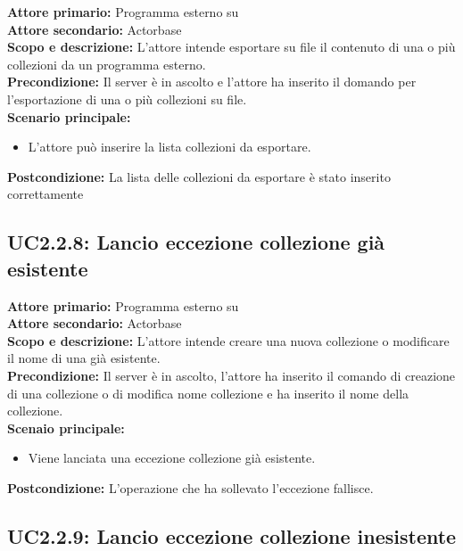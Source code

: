 \documentclass{scalatekids-article}
\begin{document}
\textbf{Attore primario:} Programma esterno su \\
\textbf{Attore secondario:} Actorbase\\
\textbf{Scopo e descrizione:} L'attore intende esportare su file il contenuto di una o più collezioni da un programma  esterno.\\
\textbf{Precondizione:} Il server è in ascolto e l'attore ha inserito il domando per l'esportazione di una o più collezioni su file.\\
\textbf{Scenario principale:}
\begin{itemize}
\item L'attore può inserire la lista collezioni da esportare.
\end{itemize}
\textbf{Postcondizione:} La lista delle collezioni da esportare è stato inserito correttamente

\subsection{UC2.2.8: Lancio eccezione collezione già esistente}

\textbf{Attore primario:} Programma esterno su \\
\textbf{Attore secondario:} Actorbase\\
\textbf{Scopo e descrizione:} L'attore intende creare una nuova collezione o modificare il nome di una già esistente.\\
\textbf{Precondizione:} Il server è in ascolto, l'attore ha inserito il comando di creazione di una collezione o di modifica nome collezione e ha inserito il nome della collezione.\\
\textbf{Scenaio principale:}
\begin{itemize}
\item Viene lanciata una eccezione collezione già esistente.
\end{itemize}
\textbf{Postcondizione:} L'operazione che ha sollevato l'eccezione fallisce.

\subsection{UC2.2.9: Lancio eccezione collezione inesistente}
\end{document}
